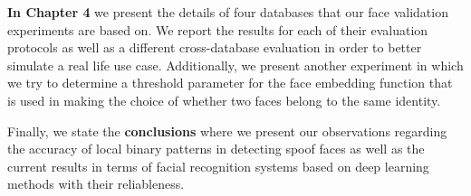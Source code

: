 \textbf{In Chapter 4} we present the details of four databases that our face validation experiments are based on. We report the results for each of their evaluation protocols as well as a different cross-database evaluation in order to better simulate a real life use case. Additionally, we present another experiment in which we try to determine a threshold parameter for the face embedding function that is used in making the choice of whether two faces belong to the same identity.

Finally, we state the \textbf{conclusions} where we present our observations regarding the accuracy of local binary patterns in detecting spoof faces as well as the current results in terms of facial recognition systems based on deep learning methods with their reliableness.
